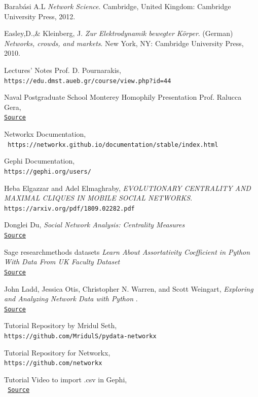 \documentclass[12pt]{article}
\begin{document}
\begin{thebibliography}{9}

	 Barabási A.L 
	\textit{Network Science}. 
	Cambridge, United Kingdom: Cambridge University Press, 2012.
	
	Easley,D.,\& Kleinberg, J.
	\textit{Zur Elektrodynamik bewegter K{\"o}rper}. (German) 
	\textit{Networks, crowds, and markets}. 
	New York, NY: Cambridge University Press, 2010.
	
	Lectures' Notes Prof. D. Pournarakis,
	\\\texttt{https://edu.dmst.aueb.gr/course/view.php?id=44}
	
	Naval Postgraduate School Monterey Homophily Presentation Prof. Ralucca Gera,
	\\\texttt{\href{https://faculty.nps.edu/rgera/MA4404/Winter2018/16-Homophily.pdf?fbclid=IwAR3rFajCl4mDfcfDCx6tLOanxDEX6k-p\_82etpYmmCSdmePeIMt-H7aZE2g}{Source}}
	
	Networkx Documentation,
	\\\texttt{	https://networkx.github.io/documentation/stable/index.html}
	
	Gephi Documentation,
	\\\texttt{https://gephi.org/users/}
	
	Heba Elgazzar and Adel Elmaghraby,
	\textit{EVOLUTIONARY CENTRALITY AND MAXIMAL CLIQUES IN MOBILE SOCIAL NETWORKS}. 
	\\\texttt{https://arxiv.org/pdf/1809.02282.pdf}
	
	Donglei Du,
	\textit{Social Network Analysis: Centrality Measures}
	\\\texttt{\href{http://www2.unb.ca/~ddu/6634/Lecture\_notes/Lecture\_4\_centrality\_measure.pdf}{Source}}
	
	Sage researchmethods datasets
	\textit{Learn About Assortativity Coefficient in Python With Data From UK Faculty Dataset}
	\\\texttt{\href{https://methods.sagepub.com/base/download/DatasetStudentGuide/assortativity-in-ukfaculty-2008-python}{Source}}
	
    John Ladd, Jessica Otis, Christopher N. Warren, and Scott Weingart,
	\textit{Exploring and Analyzing Network Data with Python }. 
	\\\texttt{\href{https://programminghistorian.org/en/lessons/exploring-and-analyzing-network-data-with-python}{Source}}
	
	Tutorial Repository by 	Mridul Seth,
	\\\texttt{https://github.com/MridulS/pydata-networkx}
	
	Tutorial Repository for Networkx,
	\\\texttt{https://github.com/networkx}
	
	Tutorial Video to import .csv in Gephi,
	\\\texttt{	\href{https://www.youtube.com/watch?v=HJ4Hcq3YX4k\&feature=youtu.be\&fbclid=IwAR2MaJUsRRWxwagv2bRxdKOqcozzb4fDDgM9qpPTLrsVLpwq8ycb1aaW7mU}{Source}}
\end{thebibliography}
\end{document}
